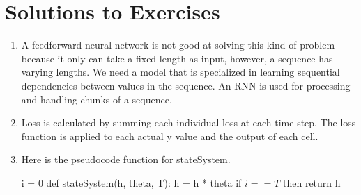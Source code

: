 \section{Solutions to Exercises}

\begin{enumerate}
    \item  A feedforward neural network is not good at solving this kind of problem because it only can take a fixed length as input, however, a sequence has varying lengths. We need a model that is specialized in learning sequential dependencies between values in the sequence. An RNN is used for processing and handling chunks of a sequence.

    \item  Loss is calculated by summing each individual loss at each time step. The loss function is applied to each actual y value and the output of each cell.  

    \item Here is the pseudocode function for stateSystem.\\

    \begin{algorithm}
    \caption{$stateSystem(\textbf{h},theta, T)$}
    \begin{algorithmic}[1]
        \State i = 0
        \State def stateSystem(h, theta, T):
            \State \indent h = h * theta
            \State \indent if $i == T$ then
		\State  \indent \indent return h
            
	\end{algorithmic} 
\end{algorithm}
   


\end{enumerate}